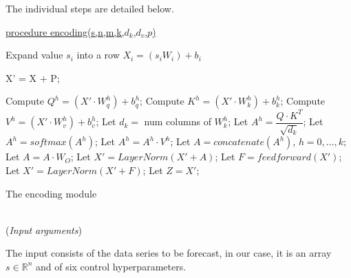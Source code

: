 \documentclass[algorithms,article,submit,pdftex,moreauthors]{Definitions/mdpi}
\begin{document}
The individual steps are detailed below.

\begin{algorithm2e}

	\underline{procedure encoding(s,n,m,k,$d_k$,$d_v$,$p$)} \label{algo:encoding}
	
	
	{\label{enc:seca1}
	   Expand value $s_i$ into a row $X_i = (s_iW_i) + b_i$
	}   \label{enc:seca2}
	
	X' = X + P;  \label{enc:positional}
        
	{ \label{enc:encoding-block1}
            {	\label{enc:multihead1}
                Compute $Q^h=(X'\cdot W_q^h) + b_q^h$;\; \label{enc:qh}
                Compute $K^h=(X'\cdot W_k^h) + b_k^h$;\; \label{enc:kh}
                Compute $V^h=(X'\cdot W_v^h) + b_v^h$;\; \label{enc:vh}
                Let $d_k=$ num columns of $W^h_k$;\; \label{enc:dk}
                Let $A^h = \dfrac{Q \cdot K^T}{\sqrt{d_k}}$;  \label{enc:attention1}
                Let $A^h = softmax\left(A^h\right)$;  \label{enc:softmax}
                Let $A^h = A^h\cdot V^h$;  \label{enc:attention2}
            } \label{enc:multihead2}
            Let $A=concatenate(A^h)$, $h=0,\dots,k$;\; \label{enc:concatenation}
            Let $A = A \cdot W_O$;  \label{enc:outproj} 
            Let $X' = LayerNorm(X' + A)$;\; \label{enc:addnorm1}
            Let $F = feedforward(X')$;  \label{enc:ffn}
            Let $X' = LayerNorm(X' + F)$;\; \label{enc:addnorm2}
        }   \label{enc:encoding-block2}                  
        Let $Z = X'$; \label{enc:output}
	\caption{The encoding module}
\end{algorithm2e}

~\\(\textit{Input arguments})

The input consists of the data series to be forecast, in our case, it is an array $s \in \mathbb{R}^n$ and of six control hyperparameters.
\end{document}
